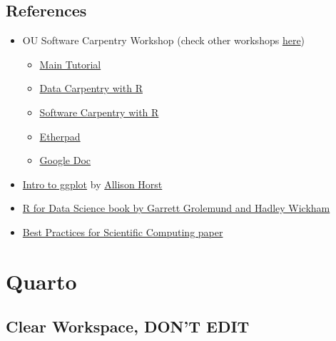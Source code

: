 \documentclass[
  letterpaper,
  DIV=11,
  numbers=noendperiod]{scrreprt}
\providecommand{\tightlist}{%
  \setlength{\itemsep}{0pt}\setlength{\parskip}{0pt}}\usepackage{longtable,booktabs,array}
\begin{document}
\section{References}\label{references}

\begin{itemize}
\tightlist
\item
  OU Software Carpentry Workshop (check other workshops
  \href{https://libraries.ou.edu/content/software-and-data-carpentry}{here})

  \begin{itemize}
  \tightlist
  \item
    \href{https://oulib-swc.github.io/2019-05-15-ou-swc/}{Main Tutorial}
  \item
    \href{https://datacarpentry.org/R-ecology-lesson/index.html}{Data
    Carpentry with R}
  \item
    \href{https://swcarpentry.github.io/r-novice-gapminder/}{Software
    Carpentry with R}
  \item
    \href{https://pad.carpentries.org/2019-05-15-ou-swc}{Etherpad}
  \item
    \href{https://docs.google.com/document/d/1aJq_X1uhaNkUj7qdZEzOcpc2Pky7eZPy76yqs0UkfrQ/edit}{Google
    Doc}
  \end{itemize}
\item
  \href{https://rawcdn.githack.com/allisonhorst/data-vis/fc107e063f50ef8695b0a75ed73d74720aca2c65/data_vis_np.html}{Intro
  to ggplot} by \href{https://github.com/allisonhorst}{Allison Horst}
\item
  \href{https://r4ds.had.co.nz/}{R for Data Science book by Garrett
  Grolemund and Hadley Wickham}
\item
  \href{http://journals.plos.org/plosbiology/article?id=10.1371/journal.pbio.1001745}{Best
  Practices for Scientific Computing paper}
\end{itemize}

\chapter{Quarto}\label{quarto}

\section*{Clear Workspace, DON'T
EDIT}\label{clear-workspace-dont-edit-1}

\end{document}
